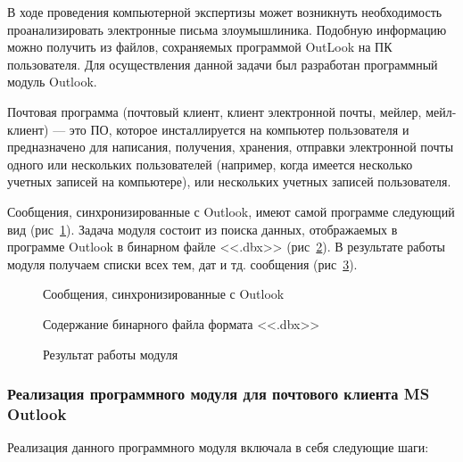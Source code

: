 В ходе проведения компьютерной экспертизы может возникнуть необходимость 
проанализировать электронные письма злоумышлиника. Подобную информацию можно 
получить из файлов, сохраняемых программой OutLook на ПК пользователя. Для 
осуществления данной задачи был разработан программный модуль Outlook.

Почтовая программа (почтовый клиент, клиент электронной почты, мейлер, мейл-клиент) --- 
это ПО, которое инсталлируется на компьютер пользователя и предназначено для 
написания, получения, хранения, отправки электронной почты одного или нескольких 
пользователей (например, когда имеется несколько учетных записей на компьютере), или 
нескольких учетных записей пользователя.

Сообщения, синхронизированные с Outlook, имеют самой программе следующий вид (рис~\ref{ser_1:ser_1}). Задача 
модуля состоит из поиска данных, отображаемых в программе Outlook в бинарном файле <<.dbx>> (рис~\ref{ser_2:ser_2}). В результате работы модуля получаем списки всех тем, дат и тд. сообщения (рис~\ref{ser_3:ser_3}).

\begin{figure}[h!]
\caption{Сообщения, синхронизированные с Outlook}
\label{ser_1:ser_1}
\end{figure} 

\begin{figure}[h!]
\caption{Содержание бинарного файла формата <<.dbx>>}
\label{ser_2:ser_2}
\end{figure} 

\begin{figure}[h!]
\caption{Результат работы модуля}
\label{ser_3:ser_3}
\end{figure} 

\clearpage
\subsubsection{Реализация программного модуля для почтового клиента MS Outlook}

Реализация данного программного модуля включала в себя следующие шаги:

